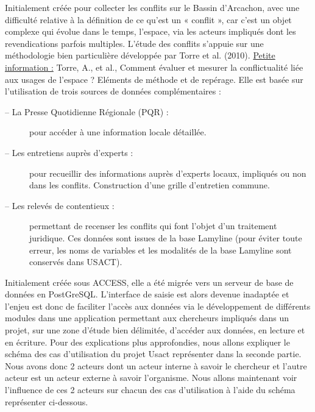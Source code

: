 \documentclass[12pt,a4paper]{article}
\begin{document}
Initialement créée pour collecter les conflits sur le Bassin d’Arcachon, avec une difficulté relative à la définition de ce qu’est un « conflit »,  car c’est un  objet complexe qui évolue dans le temps, l’espace, via les acteurs impliqués dont les revendications parfois multiples. L’étude des conflits s’appuie sur une méthodologie bien particulière développée par Torre et al. (2010). \newline
\underline {Petite information :} Torre, A., et al., Comment évaluer et mesurer la conflictualité liée aux usages de l'espace ? Eléments de méthode et de repérage. \newline \newline
Elle est basée sur l’utilisation de trois sources de données complémentaires :
\begin{description}
\item[–	La Presse Quotidienne Régionale  (PQR) :] pour accéder à une information locale détaillée. 
\item[–	Les entretiens auprès d’experts :] pour recueillir des informations auprès d’experts locaux, impliqués ou non dans les conflits. Construction d’une grille d’entretien commune. 
\item[–	Les relevés de contentieux :] permettant de recenser les conflits qui font l’objet d’un  traitement juridique. Ces données sont issues de la base Lamyline (pour éviter toute erreur, les noms de variables et les modalités de la base Lamyline sont conservés dans USACT). \newline
\end{description}


Initialement créée sous ACCESS, elle a été migrée vers un serveur de base de données en PostGreSQL. L’interface de saisie est alors devenue inadaptée et l’enjeu est donc de faciliter l’accès aux données via le développement de différents modules dans une application permettant aux chercheurs impliqués dans un projet, sur une zone d’étude bien délimitée, d’accéder aux données, en lecture et en écriture. \newline \newline
Pour des explications plus approfondies, nous allons expliquer le schéma des cas d'utilisation du projet Usact représenter dans la seconde partie. \newline
Nous avons donc 2 acteurs dont un acteur interne à savoir le chercheur et l'autre acteur est un acteur externe à savoir l'organisme. \newline
Nous allons maintenant voir l'influence de ces 2 acteurs sur chacun des cas d'utilisation à l'aide du schéma représenter ci-dessous.
\end{document}
